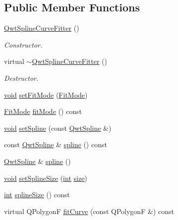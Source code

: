 \subsection*{Public Member Functions}
\begin{DoxyCompactItemize}
\item 
\hyperlink{class_qwt_spline_curve_fitter_a98ae80240b254df85dcc44e1f3e4e830}{Qwt\-Spline\-Curve\-Fitter} ()
\begin{DoxyCompactList}\small\item\em Constructor. \end{DoxyCompactList}\item 
virtual \hyperlink{class_qwt_spline_curve_fitter_a933ecbf859698978104d0dd4ec2a2f6a}{$\sim$\-Qwt\-Spline\-Curve\-Fitter} ()
\begin{DoxyCompactList}\small\item\em Destructor. \end{DoxyCompactList}\item 
\hyperlink{group___u_a_v_objects_plugin_ga444cf2ff3f0ecbe028adce838d373f5c}{void} \hyperlink{class_qwt_spline_curve_fitter_a8381be57ee16b5a2bdacafbd5d71908b}{set\-Fit\-Mode} (\hyperlink{class_qwt_spline_curve_fitter_a8c5e6858f885b5691c30092a950879a8}{Fit\-Mode})
\item 
\hyperlink{class_qwt_spline_curve_fitter_a8c5e6858f885b5691c30092a950879a8}{Fit\-Mode} \hyperlink{class_qwt_spline_curve_fitter_a473468f2151839f3290975f6b18f1c4f}{fit\-Mode} () const 
\item 
\hyperlink{group___u_a_v_objects_plugin_ga444cf2ff3f0ecbe028adce838d373f5c}{void} \hyperlink{class_qwt_spline_curve_fitter_a7f819ad010b19d58179655e4ceb1c6f1}{set\-Spline} (const \hyperlink{class_qwt_spline}{Qwt\-Spline} \&)
\item 
const \hyperlink{class_qwt_spline}{Qwt\-Spline} \& \hyperlink{class_qwt_spline_curve_fitter_a7e5211e9e84df705d8bbbc7a57fbfa6d}{spline} () const 
\item 
\hyperlink{class_qwt_spline}{Qwt\-Spline} \& \hyperlink{class_qwt_spline_curve_fitter_ac501260a25953e1ded6bbc84c3250fa8}{spline} ()
\item 
\hyperlink{group___u_a_v_objects_plugin_ga444cf2ff3f0ecbe028adce838d373f5c}{void} \hyperlink{class_qwt_spline_curve_fitter_a8ecea80fb540b92cd22b6b0703636460}{set\-Spline\-Size} (\hyperlink{ioapi_8h_a787fa3cf048117ba7123753c1e74fcd6}{int} \hyperlink{glext_8h_a014d89bd76f74ef3a29c8f04b473eb76}{size})
\item 
\hyperlink{ioapi_8h_a787fa3cf048117ba7123753c1e74fcd6}{int} \hyperlink{class_qwt_spline_curve_fitter_a09e5cb291c90db0aa8e6e51377bc9308}{spline\-Size} () const 
\item 
virtual Q\-Polygon\-F \hyperlink{class_qwt_spline_curve_fitter_a14d64180d7777d0cd9c2adf81e120140}{fit\-Curve} (const Q\-Polygon\-F \&) const 
\end{DoxyCompactItemize}
